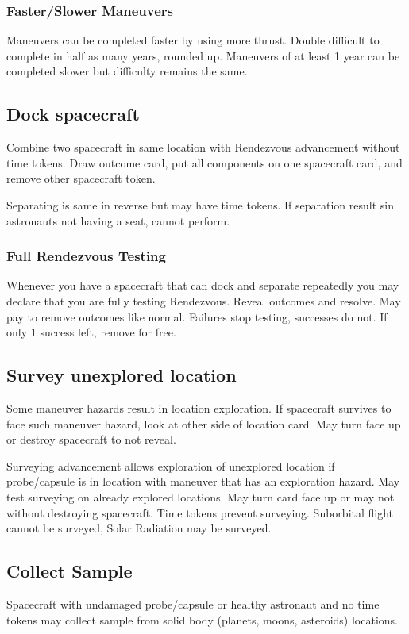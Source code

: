 \documentclass[12pt]{article}
\begin{document}
\begin{multicols*}{2}
\subsubsection*{Faster/Slower Maneuvers}
Maneuvers can be completed faster by using more thrust. Double difficult to complete in half as many years, rounded up. Maneuvers of at least 1 year can be completed slower but difficulty remains the same.

\subsection*{Dock spacecraft}
Combine two spacecraft in same location with Rendezvous advancement without time tokens. Draw outcome card, put all components on one spacecraft card, and remove other spacecraft token.

Separating is same in reverse but may have time tokens. If separation result sin astronauts not having a seat, cannot perform.

\subsubsection*{Full Rendezvous Testing}
Whenever you have a spacecraft that can dock and separate repeatedly you
may declare that you are fully testing Rendezvous. Reveal outcomes and resolve. May pay to remove outcomes like normal. Failures stop testing, successes do not. If only 1 success left, remove for free.

\subsection*{Survey unexplored location}
Some maneuver hazards result in location exploration. If spacecraft survives to face such maneuver hazard, look at other side of location card. May turn face up or destroy spacecraft to not reveal.

Surveying advancement allows exploration of unexplored location if probe/capsule is in location with maneuver that has an exploration hazard. May test surveying on already explored locations. May turn card face up or may not without destroying spacecraft. Time tokens prevent surveying. Suborbital flight cannot be surveyed, Solar Radiation may be surveyed.

\subsection*{Collect Sample}
Spacecraft with undamaged probe/capsule or healthy astronaut and no time tokens may collect sample from solid body (planets, moons, asteroids) locations.


\end{multicols*}
\end{document}
